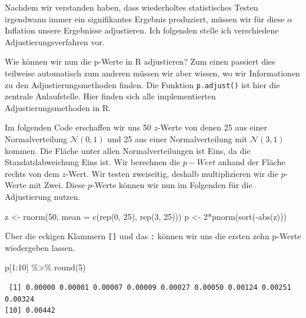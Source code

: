 \documentclass[
  letterpaper,
]{scrbook}
\newenvironment{Shaded}{\begin{snugshade}}{\end{snugshade}}
\newcommand{\AttributeTok}[1]{\textcolor[rgb]{0.40,0.45,0.13}{#1}}
\newcommand{\DecValTok}[1]{\textcolor[rgb]{0.68,0.00,0.00}{#1}}
\newcommand{\FunctionTok}[1]{\textcolor[rgb]{0.28,0.35,0.67}{#1}}
\newcommand{\NormalTok}[1]{\textcolor[rgb]{0.00,0.23,0.31}{#1}}
\newcommand{\OtherTok}[1]{\textcolor[rgb]{0.00,0.23,0.31}{#1}}
\newcommand{\SpecialCharTok}[1]{\textcolor[rgb]{0.37,0.37,0.37}{#1}}
\begin{document}
Nachdem wir verstanden haben, dass wiederholtes statistisches Testen
irgendwann immer ein signifikantes Ergebnis produziert, müssen wir für
diese \(\alpha\) Inflation unsere Ergebnisse adjustieren. Ich folgenden
stelle ich verschiedene Adjustierungsverfahren vor.

Wie können wir nun die p-Werte in R adjustieren? Zum einen passiert dies
teilweise automatisch zum anderen müssen wir aber wissen, wo wir
Informationen zu den Adjustierungsmethoden finden. Die Funktion
\texttt{p.adjust()} ist hier die zentrale Anlaufstelle. Hier finden sich
alle implementierten Adjustierungsmethoden in R.

Im folgenden Code erschaffen wir uns 50 \(z\)-Werte von denen 25 aus
einer Normalverteilung \(\mathcal{N}(0, 1)\) und 25 aus einer
Normalverteilung mit \(\mathcal{N}(3, 1)\) kommen. Die Fläche unter
allen Normalverteilungen ist Eins, da die Standatdabweichung Eins ist.
Wir berechnen die \(p-Wert\) anhand der Fläche rechts von dem
\(z\)-Wert. Wir testen zweiseitig, deshalb multiplizieren wir die
\(p\)-Werte mit Zwei. Diese \(p\)-Werte können wir nun im Folgenden für
die Adjustierung nutzen.

\begin{Shaded}
\begin{Highlighting}[]
\NormalTok{z }\OtherTok{\textless{}{-}} \FunctionTok{rnorm}\NormalTok{(}\DecValTok{50}\NormalTok{, }\AttributeTok{mean =} \FunctionTok{c}\NormalTok{(}\FunctionTok{rep}\NormalTok{(}\DecValTok{0}\NormalTok{, }\DecValTok{25}\NormalTok{), }\FunctionTok{rep}\NormalTok{(}\DecValTok{3}\NormalTok{, }\DecValTok{25}\NormalTok{)))}
\NormalTok{p }\OtherTok{\textless{}{-}} \DecValTok{2}\SpecialCharTok{*}\FunctionTok{pnorm}\NormalTok{(}\FunctionTok{sort}\NormalTok{(}\SpecialCharTok{{-}}\FunctionTok{abs}\NormalTok{(z)))}
\end{Highlighting}
\end{Shaded}

Über die eckigen Klammern \texttt{{[}{]}} und das \texttt{:} können wir
uns die ersten zehn p-Werte wiedergeben lassen.

\begin{Shaded}
\begin{Highlighting}[]
\NormalTok{p[}\DecValTok{1}\SpecialCharTok{:}\DecValTok{10}\NormalTok{] }\SpecialCharTok{\%\textgreater{}\%} \FunctionTok{round}\NormalTok{(}\DecValTok{5}\NormalTok{)}
\end{Highlighting}
\end{Shaded}

\begin{verbatim}
 [1] 0.00000 0.00001 0.00007 0.00009 0.00027 0.00050 0.00124 0.00251 0.00324
[10] 0.00442
\end{verbatim}
\end{document}
